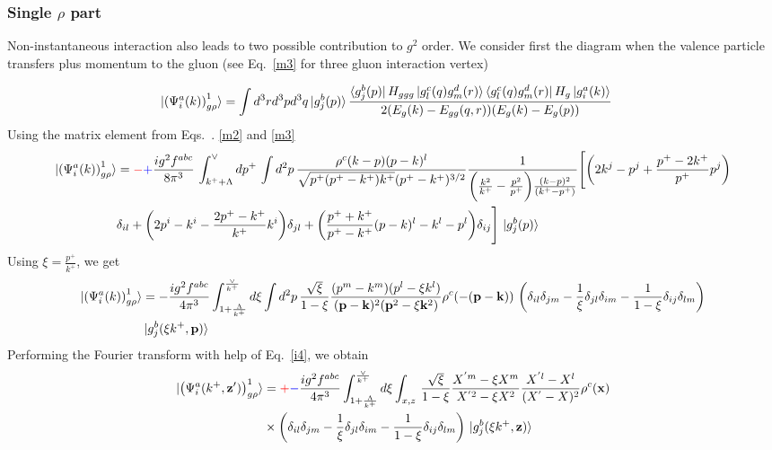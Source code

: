 \documentclass[aps,prd,amsmath,amssymb,nofootinbib]{revtex4-2}
\def\v#1{\mathbf{#1}}
\numberwithin{equation}{section}
\begin{document}
\subsubsection{Single $\rho$ part}
Non-instantaneous interaction also leads to two possible contribution to $g^2$ order. We consider first the diagram when the valence particle transfers plus momentum to the gluon 
(see Eq.~\eqref{m3} for three gluon interaction vertex)
\begin{figure}[h]
\end{figure}
\begin{align}\label{onegrho1}
  \ket{ \left(\Psi^{a}_{i}(k) \right)^{1}_{g \rho} }%
   & =
   \int d^3 r d^3p d^3q %
   \ket{g^{b}_{j}(p)}
   \frac{ \bra{g^{b}_{j}(p)}H_{ggg}\ket{g^{c}_{l}(q)g^{d}_{m}(r)}\bra{g^{c}_{l}(q)g^{d}_{m}(r)}H_{g}\ket{g^{a}_{i}(k)}}
   {2(E_{g}(k)-E_{gg}(q,r))(E_{g}(k)-E_{g}(p))}
   \end{align}
   Using the matrix element from Eqs.~. \eqref{m2} and \eqref{m3}
   \begin{align}\label{onegrho12}
\ket{ \left(\Psi^{a}_{i}(k) \right)^{1}_{g \rho} }   & = \textcolor{red}{-}\textcolor{blue}{+}\frac{ig^{2}f^{abc}}{8\pi^{3}}\,\int_{k^{+}+\Lambda}^{\vee} dp^{+}\,\int d^{2}p\,\frac{\rho^{c}(k-p)(p-k)^{l}}{\sqrt{p^{+}(p^{+}-k^{+})k^{+}}(p^{+}-k^{+})^{3/2}} \frac{1}{\bigg(\frac{k^{2}}{k^{+}}-\frac{p^{2}}{p^{+}}\bigg)\frac{(k-p)^{2}}{(k^{+}-p^{+})}}\Bigg[\bigg(2k^{j}-p^{j}+\frac{p^{+}-2k^{+}}{p^{+}}p^{j}\bigg)\notag \\ & \delta_{il} +\bigg(2p^{i}-k^{i}-\frac{2p^{+}-k^{+}}{k^{+}}k^{i}\bigg)\delta_{jl}+\bigg(\frac{p^{+}+k^{+}}{p^{+}-k^{+}}(p-k)^{l} - k^{l} - p^{l}\bigg)\delta_{ij}\Bigg]\,\ket{g^{b}_{j}(p)}
\end{align}
Using $\xi = \frac{p^{+}}{k^{+}}$, we get
\begin{align}
 \ket{ \left(\Psi^{a}_{i}(k) \right)^{1}_{g \rho} } &  = - \frac{ig^2 f^{abc}} {4 \pi^3} 
   \int_{1+ \frac{\Lambda}{k^+}   }^{\frac{\vee}{k^+}} %
   d \xi 
   \int d^2p \,
   \frac{\sqrt{\xi}}{1-\xi} \frac{(p^m-k^m) (p^l -\xi k^l)} {(\v{p}-\v{k})^2 (\v{p}^2 - \xi \v{k}^2)}
   \rho^c(-(\v{p}-\v{k}))\,\left( 
  \delta_{il} \delta_{jm}
  - \frac{1}{\xi}\delta_{jl} \delta_{im}
  - \frac{1}{1-\xi}\delta_{ij} \delta_{lm}
   \right)\notag \\ & \ket{g^{b}_{j}(\xi k^+,\v{p})}
\end{align}
Performing the Fourier transform with help of Eq.~\eqref{i4}, we obtain
\begin{align}%
\label{Eq:onegrhoX1}
  \notag
  \ket{ \left(\Psi^{a}_{i} ( k^+, \v{z}') \right)^{1}_{g \rho} }%
   \notag
   &=
   \textcolor{red}{+}\textcolor{blue}{-}\frac{ig^2 f^{abc}} {4 \pi^3} 
   \int_{1+ \frac{\Lambda}{k^+}   }^{\frac{\vee}{k^+}} %
   d \xi 
   \int_{x,z}\,
   \frac{\sqrt{\xi}}{1-\xi} 
   \frac{X^{'m} - \xi X^m} {X^{'2} - \xi X^2}
   \frac{X^{'l} -  X^l } {(X^{'} -  X)^2}
   \rho^c(\v{x})
  \notag \\ & \times \left( 
  \delta_{il} \delta_{jm}
  - \frac{1}{\xi}\delta_{jl} \delta_{im}
  - \frac{1}{1-\xi}\delta_{ij} \delta_{lm}
   \right)\,\ket{g^{b}_{j}(\xi k^+,\v{z})}
\end{align}
\end{document}
